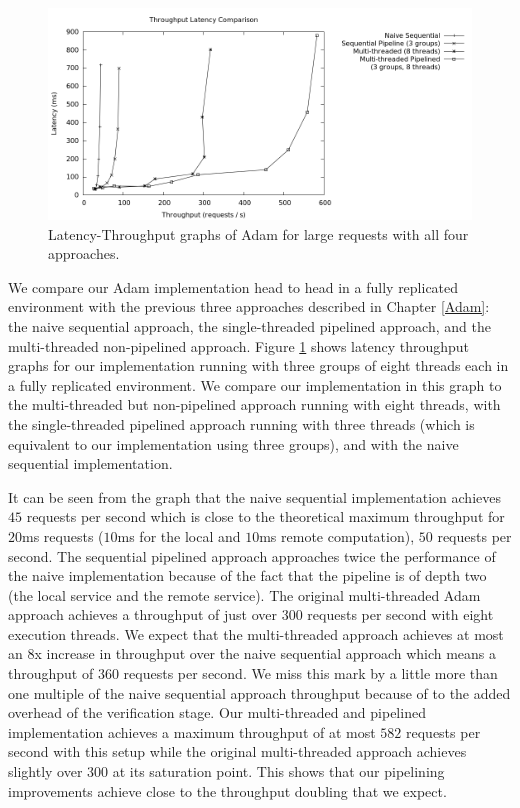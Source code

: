 \documentclass[11pt, oneside]{report}
\begin{document}
\begin{figure}[h]
\centering
\includegraphics[width=1.0\textwidth]{graphs/latencythroughput/graph.png}
\caption{\label{head2head}Latency-Throughput graphs of Adam for large requests with all four approaches.}
\end{figure}

We compare our Adam implementation head to head in a fully replicated environment with the previous three approaches described in Chapter \ref{Adam}: the naive sequential approach, the single-threaded pipelined approach, and the multi-threaded non-pipelined approach. 
Figure \ref{head2head} shows latency throughput graphs for our implementation running with three groups of eight threads each in a fully replicated environment. 
We compare our implementation in this graph to the multi-threaded but non-pipelined approach running with eight threads, with the single-threaded pipelined approach running with three threads (which is equivalent to our implementation using three groups), and with the naive sequential implementation. 

It can be seen from the graph that the naive sequential implementation achieves $45$ requests per second which is close to the theoretical maximum throughput for $20$ms requests ($10$ms for the local and $10$ms remote computation), $50$ requests per second. 
The sequential pipelined approach approaches twice the performance of the naive implementation because of the fact that the pipeline is of depth two (the local service and the remote service).
The original multi-threaded Adam approach achieves a throughput of just over $300$ requests per second with eight execution threads. 
We expect that the multi-threaded approach achieves at most an 8x increase in throughput over the naive sequential approach which means a throughput of $360$ requests per second.
We miss this mark by a little more than one multiple of the naive sequential approach throughput because of to the added overhead of the verification stage.
Our multi-threaded and pipelined implementation achieves a maximum throughput of at most $582$ requests per second with this setup while the original multi-threaded approach achieves slightly over $300$ at its saturation point. 
This shows that our pipelining improvements achieve close to the throughput doubling that we expect.
\end{document}
